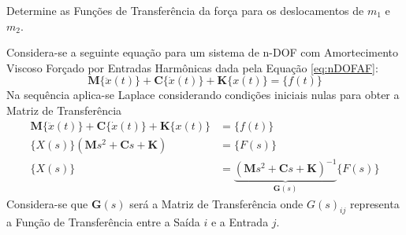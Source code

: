 \documentclass{article}
\begin{document}
\newpage\begin{exercise}\label{ex6}
    Determine as Funções de Transferência da força para os deslocamentos de $m_1$ e $m_2$.
\end{exercise}
\begin{resolution}
    Considera-se a seguinte equação para um sistema de n-DOF com Amortecimento Viscoso Forçado por Entradas Harmônicas dada pela Equação \ref{eq:nDOFAF}:
    \begin{equation*}
        \mathbf{M}\{\ddot{x}(t)\} + \mathbf{C}\{\dot{x}(t)\} + \mathbf{K}\{x(t)\} = \{f(t)\}
    \end{equation*}
    Na sequência aplica-se Laplace considerando condições iniciais nulas para obter a Matriz de Transferência
    \begin{align*}
        \mathbf{M}\{\ddot{x}(t)\} + \mathbf{C}\{\dot{x}(t)\} + \mathbf{K}\{x(t)\} &= \{f(t)\}\\
        \{X(s)\}(\mathbf{M}s^2 + \mathbf{C}s + \mathbf{K}) &= \{F(s)\}\\
        \{X(s)\} &= \underbrace{(\mathbf{M}s^2 + \mathbf{C}s + \mathbf{K})^{-1}}_{\mathbf{G}(s)}\{F(s)\}
    \end{align*}
    Considera-se que $\mathbf{G}(s)$ será a Matriz de Transferência onde $G(s)_{ij}$ representa a Função de Transferência entre a Saída $i$ e a Entrada $j$.\\


\end{resolution}
\end{document}
